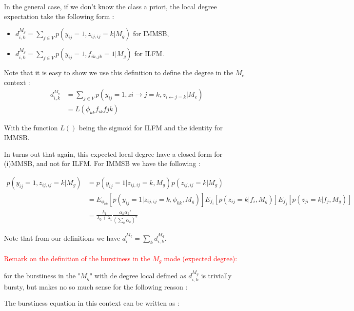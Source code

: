 \documentclass{llncs}
\begin{document}
In the general case, if we don't know the class a priori, the local degree expectation take the following form :

\begin{itemize}
\item  $d_{i,k}^{M_g} = \sum_{j\in V} p(y_{ij}=1, z_{ij, ij}=k | M_g)$ for IMMSB,
\item  $d_{i,k}^{M_g} = \sum_{j\in V} p(y_{ij}=1, f_{ik, jk}=1| M_g)$ for ILFM.
\end{itemize}

Note that it is easy to show we use this definition to define the degree in the $M_e$ context :
\begin{align*}
 d_{i,k}^{M_e} &= \sum_{j\in V} p(y_{ij}=1, z{i\rightarrow j}=k, z_{i\leftarrow j =k} | M_e) \\
  &= L(\phi_{kk} f_{ik} f{jk})
 \end{align*}
 
With the function $L()$ being the sigmoid for ILFM and the identity for IMMSB.

In turns out that again, this expected local degree have a closed form for (i)MMSB, and not for ILFM. For IMMSB we have the following :

\begin{align*}
p(y_{ij}=1, z_{ij, ij}=k | M_g) &= p(y_{ij}=1 |  z_{ij, ij}=k, M_g) p( z_{ij, ij}=k | M_g) \\
 &=E_{\phi_{kk}}[ p(y_{ij}=1 |  z_{ij, ij}=k, \phi_{kk}, M_g) ] E_{f_i}[ p( z_{ij}=k | f_i, M_g)] E_{f_j}[ p( z_{ji}=k | f_j, M_g)] \\
 &= \frac{\lambda_1}{\lambda_0+\lambda_1}\frac{ \alpha_k\alpha_k'}{ (\sum_k \alpha_k)^2}
\end{align*}

Note that from our definitions we have $d_i^{M_g} = \sum_k d_{i,k}^{M_g}$.


\paragraph{}
\textcolor{red}{Remark on the definition of the burstiness in the $M_g$ mode (expected degree):
\hrulefill
\hrulefill
~\\
}

for the burstiness in the "$M_g$" with de degree local defined as $d_{i,k}^{M_g}$  is trivially bursty, but makes no so much sense for the following reason :

The burstiness equation in this context can be written as :
\end{document}
